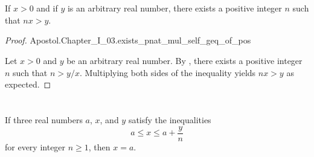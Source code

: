 \documentclass{report}
\begin{document}
\section{}%
\label{sec:archimedean-property-reals}
\label{sec:theorem-i.30}

\begin{theorem}[I.30]

  If $x > 0$ and if $y$ is an arbitrary real number, there exists a positive
    integer $n$ such that $nx > y$.

\end{theorem}

\begin{proof}

    {Apostol.Chapter\_I\_03.exists\_pnat\_mul\_self\_geq\_of\_pos}

  Let $x > 0$ and $y$ be an arbitrary real number.
  By , there exists a positive integer $n$ such that
    $n > y / x$.
  Multiplying both sides of the inequality yields $nx > y$ as expected.

\end{proof}

\section{}%
\label{sec:theorem-i.31}

\begin{theorem}[I.31]

  If three real numbers $a$, $x$, and $y$ satisfy the inequalities
    $$a \leq x \leq a + \frac{y}{n}$$ for every integer $n \geq 1$, then
    $x = a$.

\end{theorem}
\end{document}
